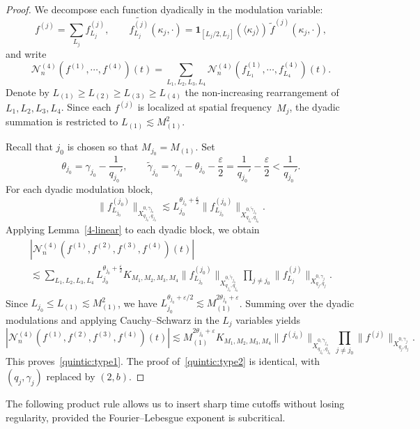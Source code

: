 \documentclass[11pt,reqno,english]{amsart}
\numberwithin{equation}{section}
\theoremstyle{plain}
\theoremstyle{definition}
\theoremstyle{remark}
\begin{document}
\begin{proof}
	We decompose each function dyadically in the modulation variable:
	\[
	f^{(j)}=\sum_{L_j} f_{L_j}^{(j)},
	\qquad
	\widetilde{f_{L_j}^{(j)}}(\kappa_j,\cdot)
	=
	\mathbf{1}_{[L_j/2,L_j]}(\langle \kappa_j\rangle)\,\widetilde{f}^{(j)}(\kappa_j,\cdot),
	\]
	and write
	\[
	\mathcal{N}_n^{(4)}(f^{(1)},\cdots,f^{(4)})(t)
	=
	\sum_{L_1,L_2,L_3,L_4}
	\mathcal{N}_n^{(4)}(f_{L_1}^{(1)},\cdots,f_{L_4}^{(4)})(t).
	\]
	Denote by $L_{(1)}\geq L_{(2)}\geq L_{(3)}\geq L_{(4)}$ the non-increasing rearrangement of $L_1,L_2,L_3,L_4$.
	Since each $f^{(j)}$ is localized at spatial frequency~$M_j$, the dyadic summation is restricted to $L_{(1)}\lesssim M_{(1)}^2$.

	Recall that $j_0$ is chosen so that $M_{j_0}=M_{(1)}$. Set
	\[
	\theta_{j_0}=\gamma_{j_0}-\frac{1}{q_{j_0}'},
	\qquad
	\widetilde{\gamma}_{j_0}
	=
	\gamma_{j_0}-\theta_{j_0}-\frac{\varepsilon}{2}
	=
	\frac{1}{q_{j_0}'}-\frac{\varepsilon}{2}
	<
	\frac{1}{q_{j_0}'}.
	\]
	For each dyadic modulation block,
	\[
	\|f_{L_{j_0}}^{(j_0)}\|_{X_{q_{j_0},q_{j_0}}^{0,\gamma_{j_0}}}
	\lesssim
	L_{j_0}^{\theta_{j_0}+\frac{\varepsilon}{2}}
	\|f_{L_{j_0}}^{(j_0)}\|_{X_{q_{j_0},q_{j_0}}^{0,\widetilde{\gamma}_{j_0}}}.
	\]
	Applying Lemma~\ref{4-linear} to each dyadic block, we obtain
	\begin{multline*}
		|\mathcal{N}_n^{(4)}(f^{(1)},f^{(2)},f^{(3)},f^{(4)})(t)|
		\\
		\lesssim
		\sum_{L_1,L_2,L_3,L_4}
		L_{j_0}^{\theta_{j_0}+\frac{\varepsilon}{2}}
		K_{M_1,M_2,M_3,M_4}
		\|f_{L_{j_0}}^{(j_0)}\|_{X_{q_{j_0},q_{j_0}}^{0,\widetilde{\gamma}_{j_0}}}
		\prod_{j\neq j_0}\|f_{L_j}^{(j)}\|_{X_{q_j,q_j}^{0,\gamma_j}}.
	\end{multline*}
	Since $L_{j_0}\leq L_{(1)}\lesssim M_{(1)}^2$, we have $L_{j_0}^{\theta_{j_0}+\varepsilon/2} \lesssim M_{(1)}^{2\theta_{j_0}+\varepsilon}$.
	Summing over the dyadic modulations and applying Cauchy--Schwarz in the $L_j$ variables yields
	\[
	|\mathcal{N}_n^{(4)}(f^{(1)},f^{(2)},f^{(3)},f^{(4)})(t)|
	\lesssim
	M_{(1)}^{2\theta_{j_0}+\varepsilon}
	K_{M_1,M_2,M_3,M_4}
	\|f^{(j_0)}\|_{X_{q_{j_0},q_{j_0}}^{0,\widetilde{\gamma}_{j_0}}}
	\prod_{j\neq j_0}\|f^{(j)}\|_{X_{q_j,q_j}^{0,\gamma_j}}.
	\]
	This proves~\eqref{quintic:type1}. The proof of~\eqref{quintic:type2} is identical, with $(q_j,\gamma_j)$ replaced by $(2,b)$.
\end{proof}
	
	The following product rule allows us to insert sharp time cutoffs without losing regularity, provided the Fourier--Lebesgue exponent is subcritical.
\end{document}
